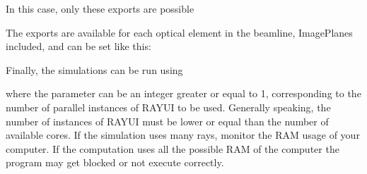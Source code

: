 \documentclass[letterpaper,10pt,english]{sphinxmanual}
\begin{document}
\sphinxAtStartPar
In this case, only these exports are possible

\begin{sphinxVerbatim}[commandchars=\\\{\}]
 \PYG{p}{[} \PYG{p}{]}
\end{sphinxVerbatim}

\sphinxAtStartPar
The exports are available for each optical element in the beamline, ImagePlanes included, and can be set like this:

\begin{sphinxVerbatim}[commandchars=\\\{\}]
    \PYG{p}{[}\PYG{p}{[}\PYG{p}{]}
                \PYG{p}{[}\PYG{p}{]}
                \PYG{p}{]}
\end{sphinxVerbatim}

\sphinxAtStartPar
Finally, the simulations can be run using

\begin{sphinxVerbatim}[commandchars=\\\{\}]
 
\end{sphinxVerbatim}

\sphinxAtStartPar
where the  parameter can be an integer greater or equal to 1, corresponding to the number of parallel instances of RAY\sphinxhyphen{}UI to be used. Generally speaking, the number of instances of RAY\sphinxhyphen{}UI must be lower or equal than the number of available cores. If the simulation uses many rays, monitor the RAM usage of your computer. If the computation uses all the possible RAM of the computer the program may get blocked or not execute correctly.
\end{document}
